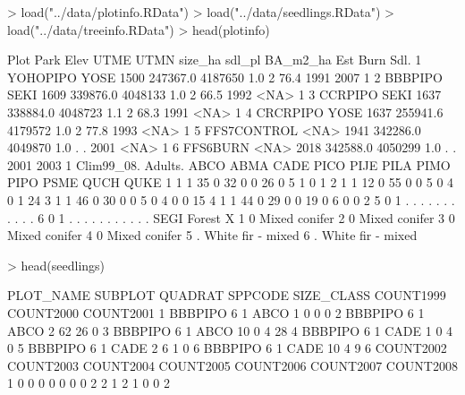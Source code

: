 \documentclass{article}
\begin{document}
\begin{Schunk}
\begin{Sinput}
> load("../data/plotinfo.RData")
> load("../data/seedlings.RData")
> load("../data/treeinfo.RData")
> head(plotinfo)
\end{Sinput}
\begin{Soutput}
         Plot Park Elev     UTME    UTMN size_ha sdl_pl BA_m2_ha  Est Burn Sdl.
1    YOHOPIPO YOSE 1500 247367.0 4187650     1.0      2     76.4 1991 2007    1
2     BBBPIPO SEKI 1609 339876.0 4048133     1.0      2     66.5 1992 <NA>    1
3     CCRPIPO SEKI 1637 338884.0 4048723     1.1      2     68.3 1991 <NA>    1
4    CRCRPIPO YOSE 1637 255941.6 4179572     1.0      2     77.8 1993 <NA>    1
5 FFS7CONTROL <NA> 1941 342286.0 4049870     1.0      .        . 2001 <NA>    1
6    FFS6BURN <NA> 2018 342588.0 4050299     1.0      .        . 2001 2003    1
  Clim99_08. Adults. ABCO ABMA CADE PICO PIJE PILA PIMO PIPO PSME QUCH QUKE
1          1       1   35    0   32    0    0   26    0    5    1    0    1
2          1       1   12    0   55    0    0    5    0    4    0    1   24
3          1       1   46    0   30    0    0    5    0    4    0    0   15
4          1       1   44    0   29    0    0   19    0    6    0    0    2
5          0       1    .    .    .    .    .    .    .    .    .    .    .
6          0       1    .    .    .    .    .    .    .    .    .    .    .
  SEGI            Forest X
1    0     Mixed conifer  
2    0     Mixed conifer  
3    0     Mixed conifer  
4    0     Mixed conifer  
5    . White fir - mixed  
6    . White fir - mixed  
\end{Soutput}
\begin{Sinput}
> head(seedlings)
\end{Sinput}
\begin{Soutput}
  PLOT_NAME SUBPLOT QUADRAT SPPCODE SIZE_CLASS COUNT1999 COUNT2000 COUNT2001
1   BBBPIPO       6       1    ABCO          1         0         0         0
2   BBBPIPO       6       1    ABCO          2        62        26         0
3   BBBPIPO       6       1    ABCO         10         0         4        28
4   BBBPIPO       6       1    CADE          1         0         4         0
5   BBBPIPO       6       1    CADE          2         6         1         0
6   BBBPIPO       6       1    CADE         10         4         9         6
  COUNT2002 COUNT2003 COUNT2004 COUNT2005 COUNT2006 COUNT2007 COUNT2008
1         0         0         0         0         0         0         0
2         2         1         2         1         0         0         2

\end{Soutput}
\end{Schunk}
\end{document}
